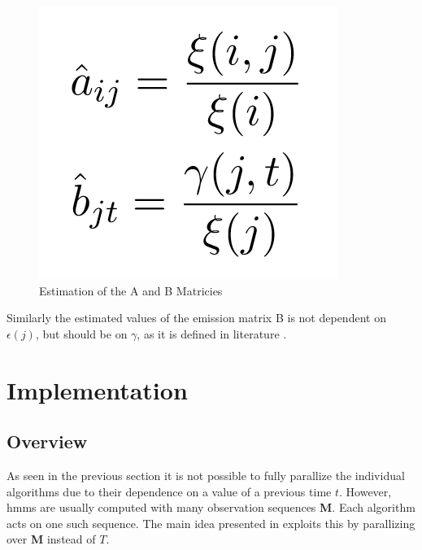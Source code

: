 \documentclass[english, paper=a4]{scrartcl}
\begin{document}
\begin{figure}[H]

\centering
\includegraphics[scale=0.4]{"estimation"}
 \caption{Estimation of the A and B Matricies \cite{cuhmm}}

\end{figure}

Similarly the estimated values of the emission matrix B is not dependent on \(\epsilon(j)\), but should be on \(\gamma\), as it is defined in literature \cite{hmm}. 

\newpage


\section{Implementation}

\subsection{Overview}

As seen in the previous section it is not possible to fully parallize the individual algorithms due to their dependence on a value of a previous time \(t\). However, hmms are usually computed with many observation sequences \textbf{M}. Each algorithm acts on one such sequence. The main idea presented in \cite{cuhmm} exploits this by parallizing over \textbf{M} instead of \(T\). 
\end{document}
